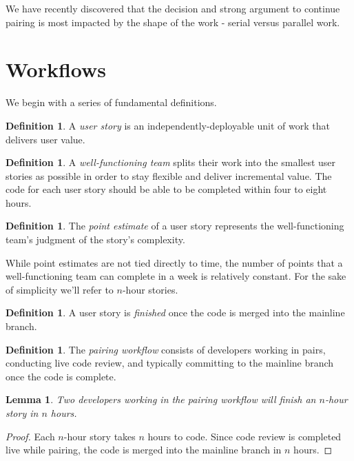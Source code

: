 \documentclass[letterpaper]{article}
\newtheorem{lemma}[theorem]{Lemma}
\theoremstyle{definition}
\newtheorem{definition}[theorem]{Definition}
\begin{document}
    We have recently discovered that the decision and strong argument to continue pairing is most impacted by the shape
    of the work - serial versus parallel work.

    \section{Workflows}\label{sec:workflows}

    We begin with a series of fundamental definitions.

    \begin{definition}
        A \textit{user story} is an independently-deployable unit of work that delivers user value.
    \end{definition}

    \begin{definition}
        A \textit{well-functioning team} splits their work into the smallest user stories as possible in order to stay
        flexible and deliver incremental value.
        The code for each user story should be able to be completed within four to eight hours.
    \end{definition}

    \begin{definition}
        The \textit{point estimate} of a user story represents the well-functioning team's judgment of the story's
        complexity.
    \end{definition}

    While point estimates are not tied directly to time, the number of points that a well-functioning team can complete
    in a week is relatively constant.
    For the sake of simplicity we'll refer to $n$-hour stories.

    \begin{definition}
        A user story is \textit{finished} once the code is merged into the mainline branch.
    \end{definition}

    \begin{definition}
        The \textit{pairing workflow} consists of developers working in pairs, conducting live code review, and
        typically committing to the mainline branch once the code is complete.
    \end{definition}

    \begin{lemma}
        \label{lemma:pair}
        Two developers working in the pairing workflow will finish an $n$-hour story in $n$ hours.
    \end{lemma}
    \begin{proof}
        Each $n$-hour story takes $n$ hours to code.
        Since code review is completed live while pairing, the code is merged into the mainline branch in $n$ hours.
    \end{proof}
\end{document}
